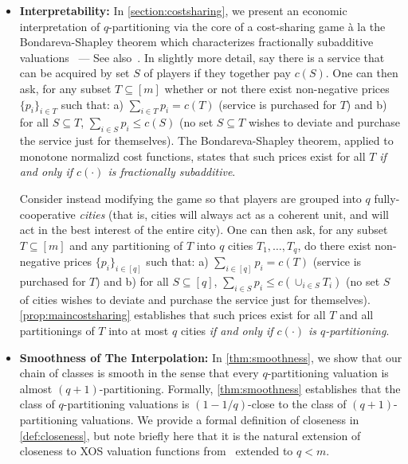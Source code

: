 \documentclass[11pt]{article}%
\numberwithin{theorem}{subsection}
\begin{document}
\begin{itemize}[noitemsep]
    \item \textbf{Interpretability:} In \cref{section:costsharing}, we present an economic interpretation of $q$-partitioning via the core of a cost-sharing game \`{a} la the Bondareva-Shapley theorem which characterizes fractionally subadditive valuations~\cite{Bondareva63,Shapley67} --- See also~\cite[Theorem~15.6]{AGTbook}. In slightly more detail, say there is a service that can be acquired by set $S$ of players if they together pay $c(S)$. One can then ask, for any subset $T \subseteq [m]$ whether or not there exist non-negative prices $\{p_i\}_{i \in T}$ such that: a) $\sum_{i \in T} p_i = c(T)$ (service is purchased for $T$) and b) for all $S\subseteq T$, $\sum_{i \in S} p_i \leq c(S)$ (no set $S\subseteq T$ wishes to deviate and purchase the service just for themselves). The Bondareva-Shapley theorem, applied to monotone normalizd cost functions, states that such prices exist for all $T$ \emph{if and only if $c(\cdot)$ is fractionally subadditive}. 

    Consider instead modifying the game so that players are grouped into $q$ fully-cooperative \emph{cities} (that is, cities will always act as a coherent unit, and will act in the best interest of the entire city). One can then ask, for any subset $T \subseteq [m]$ and any partitioning of $T$ into $q$ cities $T_1,\ldots, T_q$, do there exist non-negative prices $\{p_i\}_{i \in [q]}$ such that: a) $\sum_{i \in [q]} p_i = c(T)$ (service is purchased for $T$) and b) for all $S \subseteq [q]$, $\sum_{i \in S} p_i \leq c(\cup_{i \in S} T_i)$ (no set $S$ of cities wishes to deviate and purchase the service just for themselves). \cref{prop:maincostsharing} establishes that such prices exist for all $T$ and all partitionings of $T$ into at most $q$ cities \emph{if and only if $c(\cdot)$ is $q$-partitioning}.
    \item \textbf{Smoothness of The Interpolation:} In \cref{thm:smoothness}, we show that our chain of classes is smooth in the sense that every $q$-partitioning valuation is almost $(q+1)$-partitioning. Formally, \cref{thm:smoothness} establishes that the class of $q$-partitioning valuations is $(1-1/q)$-close to the class of $(q+1)$-partitioning valuations. We provide a formal definition of closeness in \cref{def:closeness}, but note briefly here that it is the natural extension of closeness to XOS valuation functions from~\cite{BhawalkarR11} extended to $q < m$.
    

\end{itemize}
\end{document}
